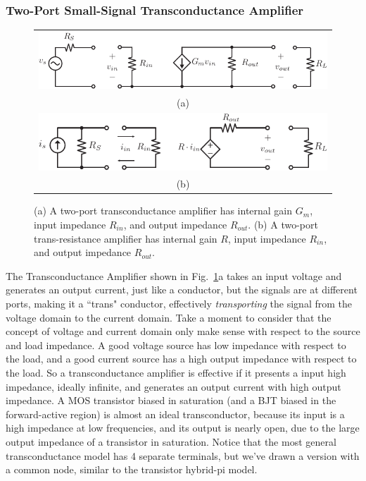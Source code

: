 \subsubsection{Two-Port Small-Signal Transconductance Amplifier}
\begin{figure}[tb]
\centering
\begin{tabular}{c}
\includegraphics[width=.7\columnwidth]{gmamp}\\
(a)\\
\includegraphics[width=.7\columnwidth]{ramp}\\
(b)\\
\end{tabular}
\caption{(a) A two-port transconductance amplifier has internal gain $G_m$, input impedance $R_{in}$, and output impedance $R_{out}$.  (b) A two-port trans-resistance amplifier has internal gain $R$, input impedance $R_{in}$, and output impedance $R_{out}$.}
\label{fig:gm_z_amp}
\end{figure}

The Transconductance Amplifier shown in Fig.~\ref{fig:gm_z_amp}a takes an input voltage and generates an output current, just like a conductor, but the signals are at different ports, making it a ``trans" conductor, effectively \emph{transporting} the signal from the voltage domain to the current domain.  Take a moment to consider that the concept of voltage and current domain only make sense with respect to the source and load impedance.  A good voltage source has low impedance with respect to the load, and a good current source has a high output impedance with respect to the load.  So a transconductance amplifier is effective if it presents a input high impedance, ideally infinite, and generates an output current with high output impedance.  A MOS transistor biased in saturation (and a BJT biased in the forward-active region) is almost an ideal transconductor, because its input is a high impedance at low frequencies, and its output is nearly open, due to the large output impedance of a transistor in saturation.  
Notice that the most general transconductance model has 4 separate terminals, but we've drawn a version with a common node, similar to the transistor hybrid-pi model. 
